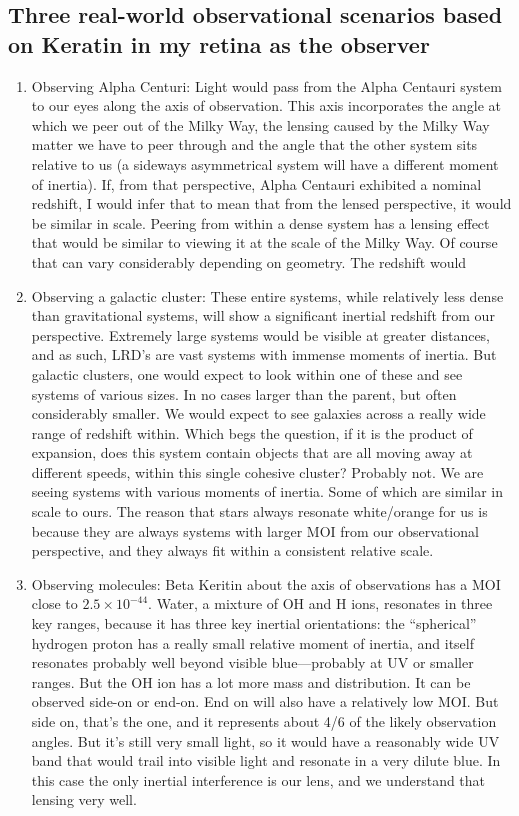 \subsection{Three real-world observational scenarios based on Keratin in my retina as the observer}
\begin{enumerate}[leftmargin=0.5cm]
    \item Observing Alpha Centuri: Light would pass from the Alpha Centauri system to our eyes along the axis of observation. This axis incorporates the angle at which we peer out of the Milky Way, the lensing caused by the Milky Way matter we have to peer through and the angle that the other system sits relative to us (a sideways asymmetrical system will have a different moment of inertia). If, from that perspective, Alpha Centauri exhibited a nominal redshift, I would infer that to mean that from the lensed perspective, it would be similar in scale. Peering from within a dense system has a lensing effect that would be similar to viewing it at the scale of the Milky Way. Of course that can vary considerably depending on geometry. The redshift would
    \item Observing a galactic cluster: These entire systems, while relatively less dense than gravitational systems, will show a significant inertial redshift from our perspective. Extremely large systems would be visible at greater distances, and as such, LRD's are vast systems with immense moments of inertia. But galactic clusters, one would expect to look within one of these and see systems of various sizes. In no cases larger than the parent, but often considerably smaller. We would expect to see galaxies across a really wide range of redshift within. Which begs the question, if it is the product of expansion, does this system contain objects that are all moving away at different speeds, within this single cohesive cluster? Probably not. We are seeing systems with various moments of inertia. Some of which are similar in scale to ours. The reason that stars always resonate white/orange for us is because they are always systems with larger MOI from our observational perspective, and they always fit within a consistent relative scale.
    \item Observing molecules: Beta Keritin about the axis of observations has a MOI close to $2.5\times10^{-44}$. Water, a mixture of OH and H ions, resonates in three key ranges, because it has three key inertial orientations: the ``spherical'' hydrogen proton has a really small relative moment of inertia, and itself resonates probably well beyond visible blue---probably at UV or smaller ranges. But the OH ion has a lot more mass and distribution. It can be observed side-on or end-on. End on will also have a relatively low MOI. But side on, that's the one, and it represents about 4/6 of the likely observation angles. But it's still very small light, so it would have a reasonably wide UV band that would trail into visible light and resonate in a very dilute blue. In this case the only inertial interference is our lens, and we understand that lensing very well.
\end{enumerate}
